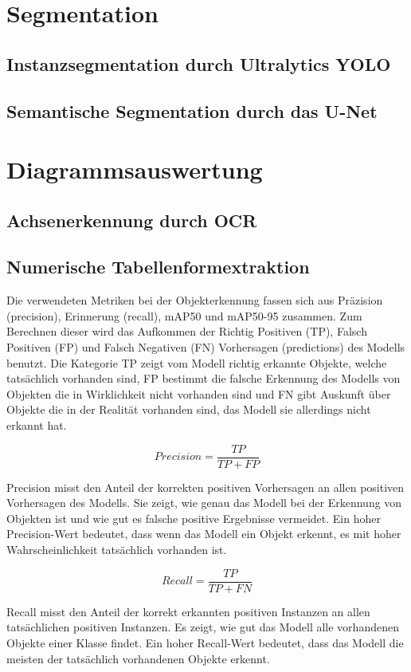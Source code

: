 \section{Segmentation}
\subsection{Instanzsegmentation durch Ultralytics YOLO}
\subsection{Semantische Segmentation durch das U-Net}

\section{Diagrammsauswertung}
\subsection{Achsenerkennung durch OCR}
\subsection{Numerische Tabellenformextraktion}


Die verwendeten Metriken bei der Objekterkennung fassen sich aus Präzision (precision), Erinnerung (recall), mAP50 und mAP50-95 zusammen. Zum Berechnen dieser wird das Aufkommen der Richtig Positiven (TP), Falsch Positiven (FP) und Falsch Negativen (FN) Vorhersagen (predictions) des Modells benutzt. Die Kategorie TP zeigt vom Modell richtig erkannte Objekte, welche tatsächlich vorhanden sind, FP bestimmt die falsche Erkennung des Modells von Objekten die in Wirklichkeit nicht vorhanden sind und FN gibt Auskunft über Objekte die in der Realität vorhanden sind, das Modell sie allerdings nicht erkannt hat.

\[Precision = \frac{TP}{TP + FP}\]

Precision misst den Anteil der korrekten positiven Vorhersagen an allen positiven Vorhersagen des Modells. Sie zeigt, wie genau das Modell bei der Erkennung von Objekten ist und wie gut es falsche positive Ergebnisse vermeidet. Ein hoher Precision-Wert bedeutet, dass wenn das Modell ein Objekt erkennt, es mit hoher Wahrscheinlichkeit tatsächlich vorhanden ist.

\[Recall = \frac{TP}{TP + FN}\]

Recall misst den Anteil der korrekt erkannten positiven Instanzen an allen tatsächlichen positiven Instanzen. Es zeigt, wie gut das Modell alle vorhandenen Objekte einer Klasse findet. Ein hoher Recall-Wert bedeutet, dass das Modell die meisten der tatsächlich vorhandenen Objekte erkennt.

